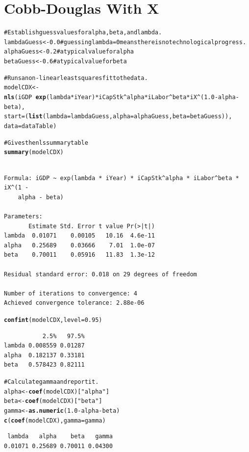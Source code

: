 \documentclass[preprint,authoryear,12pt]{elsarticle}\usepackage{graphicx, color}
\makeatletter
\newcommand{\hlfunctioncall}[1]{\textcolor[rgb]{0.501960784313725,0,0.329411764705882}{\textbf{#1}}}%
\newcommand{\hlstring}[1]{\textcolor[rgb]{0.6,0.6,1}{#1}}%
\newcommand{\hlcomment}[1]{\textcolor[rgb]{0.180392156862745,0.6,0.341176470588235}{#1}}%
\newenvironment{kframe}{%
 \def\at@end@of@kframe{}%
 \ifinner\ifhmode%
  \def\at@end@of@kframe{\end{minipage}}%
  \begin{minipage}{\columnwidth}%
 \fi\fi%
 \def\FrameCommand##1{\hskip\@totalleftmargin \hskip-\fboxsep
 \colorbox{shadecolor}{##1}\hskip-\fboxsep
     \hskip-\linewidth \hskip-\@totalleftmargin \hskip\columnwidth}%
 \MakeFramed {\advance\hsize-\width
   \@totalleftmargin\z@ \linewidth\hsize
   \@setminipage}}%
 {\par\unskip\endMakeFramed%
 \at@end@of@kframe}
\newenvironment{knitrout}{}{} %
\makeatother
\begin{document}
\section{Cobb-Douglas With X}

\begin{knitrout}
\color{fgcolor}\begin{kframe}
\begin{alltt}
\hlcomment{# Establish guess values for alpha, beta, and lambda.}
lambdaGuess <- 0.0 \hlcomment{# guessing lambda = 0 means there is no technological progress.}
alphaGuess <- 0.2 \hlcomment{# a typical value for alpha}
betaGuess <- 0.6 \hlcomment{# a typical value for beta}

\hlcomment{# Runs a non-linear least squares fit to the data.}
modelCDX <- \hlfunctioncall{nls}(iGDP ~ \hlfunctioncall{exp}(lambda*iYear) * iCapStk^alpha * iLabor^beta * iX^(1.0 - alpha - beta), 
                start=(\hlfunctioncall{list}(lambda=lambdaGuess,alpha=alphaGuess,beta=betaGuess)),
                data=dataTable)

\hlcomment{# Gives the nls summary table}
\hlfunctioncall{summary}(modelCDX)
\end{alltt}
\begin{verbatim}

Formula: iGDP ~ exp(lambda * iYear) * iCapStk^alpha * iLabor^beta * iX^(1 - 
    alpha - beta)

Parameters:
       Estimate Std. Error t value Pr(>|t|)
lambda  0.01071    0.00105   10.16  4.6e-11
alpha   0.25689    0.03666    7.01  1.0e-07
beta    0.70011    0.05916   11.83  1.3e-12

Residual standard error: 0.018 on 29 degrees of freedom

Number of iterations to convergence: 4 
Achieved convergence tolerance: 2.88e-06 
\end{verbatim}
\begin{alltt}
\hlfunctioncall{confint}(modelCDX, level = 0.95)
\end{alltt}


{\ttfamily\noindent\itshape\color{messagecolor}{Waiting for profiling to be done...}}\begin{verbatim}
           2.5%   97.5%
lambda 0.008559 0.01287
alpha  0.182137 0.33181
beta   0.578423 0.82111
\end{verbatim}
\begin{alltt}

\hlcomment{# Calculate gamma and report it.}
alpha <- \hlfunctioncall{coef}(modelCDX)[\hlstring{"alpha"}] 
beta <- \hlfunctioncall{coef}(modelCDX)[\hlstring{"beta"}] 
gamma <- \hlfunctioncall{as.numeric}(1.0 - alpha - beta)
\hlfunctioncall{c}(\hlfunctioncall{coef}(modelCDX),gamma=gamma)
\end{alltt}
\begin{verbatim}
 lambda   alpha    beta   gamma 
0.01071 0.25689 0.70011 0.04300 
\end{verbatim}
\begin{alltt}


\end{alltt}
\end{kframe}
\end{knitrout}
\end{document}

